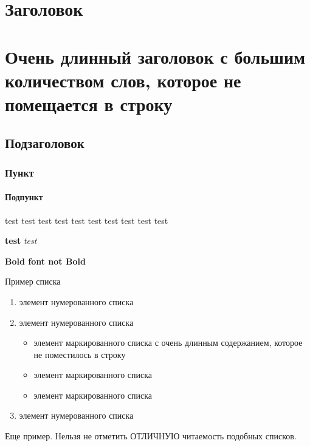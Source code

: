 \section{Заголовок}\label{_section}

\section{Очень длинный заголовок с большим количеством слов, которое не помещается в строку}

\subsection{Подзаголовок}\label{_subsection}

\subsubsection{Пункт}\label{_subsubsection}

\paragraph{Подпункт}\label{_paragraph}

{\tiny test}
{\scriptsize test}
{\footnotesize test}
{\small test}
{\normalsize test}
{\large test}
{\Large test}
{\LARGE test}
{\huge test}
{\Huge test}

\textbf{test}
\textit{test}

\textbf{Bold font \normalfont{}not Bold}

Пример списка

\begin{enumerate}
    \item элемент нумерованного списка
    \item элемент нумерованного списка
    \begin{itemize}
        \item элемент маркированного списка 
            с очень длинным содержанием, которое 
            не поместилось в строку
        \item элемент маркированного списка
        \item элемент маркированного списка
    \end{itemize}
    \item элемент нумерованного списка
\end{enumerate}

Еще пример. Нельзя не отметить ОТЛИЧНУЮ читаемость подобных списков.

